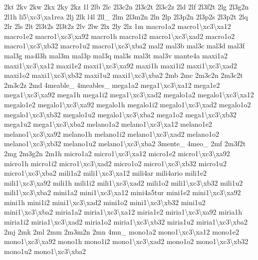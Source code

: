 \begin{DoxyCompactItemize}
2kt 2kv 2kw 2kx 2ky 2kz 1l 2lb 2lc 2l3c2n 2l3c2t 2l3c2z 2ld 2lf 2l3f2t 2lg 2l3g2n 2l1h li5\textbackslash{}xc3\textbackslash{}xa1rea 2lj 2lk l4l 2ll\-\_\- 2lm 2l3m2n 2ln 2lp 2l3p2n 2l3p2s 2l3p2t 2lq 2lr 2ls 2lt 2l3t2s 2l3t2z 2lv 2lw 2lx 2ly 2lz 1m macro1a2 macro1\textbackslash{}xc3\textbackslash{}xa12 macro1e2 macro1\textbackslash{}xc3\textbackslash{}xa92 macro1h macro1i2 macro1\textbackslash{}xc3\textbackslash{}xad2 macro1o2 macro1\textbackslash{}xc3\textbackslash{}xb32 macro1u2 macro1\textbackslash{}xc3\textbackslash{}xba2 mal2 mal3b mal3c mal3d mal3f mal3g ma4l3h mal3m mal3p mal3q mal3s mal3t mal3v mante4a maxi1a2 maxi1\textbackslash{}xc3\textbackslash{}xa12 maxi1e2 maxi1\textbackslash{}xc3\textbackslash{}xa92 maxi1h maxi1i2 maxi1\textbackslash{}xc3\textbackslash{}xad2 maxi1o2 maxi1\textbackslash{}xc3\textbackslash{}xb32 maxi1u2 maxi1\textbackslash{}xc3\textbackslash{}xba2 2mb 2mc 2m3c2n 2m3c2t 2m3c2z 2md 4meable\-\_\- 4meables\-\_\- mega1a2 mega1\textbackslash{}xc3\textbackslash{}xa12 mega1e2 mega1\textbackslash{}xc3\textbackslash{}xa92 mega1h mega1i2 mega1\textbackslash{}xc3\textbackslash{}xad2 megalo1a2 megalo1\textbackslash{}xc3\textbackslash{}xa12 megalo1e2 megalo1\textbackslash{}xc3\textbackslash{}xa92 megalo1h megalo1i2 megalo1\textbackslash{}xc3\textbackslash{}xad2 megalo1o2 megalo1\textbackslash{}xc3\textbackslash{}xb32 megalo1u2 megalo1\textbackslash{}xc3\textbackslash{}xba2 mega1o2 mega1\textbackslash{}xc3\textbackslash{}xb32 mega1u2 mega1\textbackslash{}xc3\textbackslash{}xba2 melano1a2 melano1\textbackslash{}xc3\textbackslash{}xa12 melano1e2 melano1\textbackslash{}xc3\textbackslash{}xa92 melano1h melano1i2 melano1\textbackslash{}xc3\textbackslash{}xad2 melano1o2 melano1\textbackslash{}xc3\textbackslash{}xb32 melano1u2 melano1\textbackslash{}xc3\textbackslash{}xba2 3mente\-\_\- 4meo\-\_\- 2mf 2m3f2t 2mg 2m3g2n 2m1h micro1a2 micro1\textbackslash{}xc3\textbackslash{}xa12 micro1e2 micro1\textbackslash{}xc3\textbackslash{}xa92 micro1h micro1i2 micro1\textbackslash{}xc3\textbackslash{}xad2 micro1o2 micro1\textbackslash{}xc3\textbackslash{}xb32 micro1u2 micro1\textbackslash{}xc3\textbackslash{}xba2 mili1a2 mili1\textbackslash{}xc3\textbackslash{}xa12 mili4ar mili4ario mili1e2 mili1\textbackslash{}xc3\textbackslash{}xa92 mili1h mili1i2 mili1\textbackslash{}xc3\textbackslash{}xad2 mili1o2 mili1\textbackslash{}xc3\textbackslash{}xb32 mili1u2 mili1\textbackslash{}xc3\textbackslash{}xba2 mini1a2 mini1\textbackslash{}xc3\textbackslash{}xa12 mini4a5tur mini1e2 mini1\textbackslash{}xc3\textbackslash{}xa92 mini1h mini1i2 mini1\textbackslash{}xc3\textbackslash{}xad2 mini1o2 mini1\textbackslash{}xc3\textbackslash{}xb32 mini1u2 mini1\textbackslash{}xc3\textbackslash{}xba2 miria1a2 miria1\textbackslash{}xc3\textbackslash{}xa12 miria1e2 miria1\textbackslash{}xc3\textbackslash{}xa92 miria1h miria1i2 miria1\textbackslash{}xc3\textbackslash{}xad2 miria1o2 miria1\textbackslash{}xc3\textbackslash{}xb32 miria1u2 miria1\textbackslash{}xc3\textbackslash{}xba2 2mj 2mk 2ml 2mm 2m3m2n 2mn 4mn\-\_\- mono1a2 mono1\textbackslash{}xc3\textbackslash{}xa12 mono1e2 mono1\textbackslash{}xc3\textbackslash{}xa92 mono1h mono1i2 mono1\textbackslash{}xc3\textbackslash{}xad2 mono1o2 mono1\textbackslash{}xc3\textbackslash{}xb32 mono1u2 mono1\textbackslash{}xc3\textbackslash{}xba2 
\end{DoxyCompactItemize}
